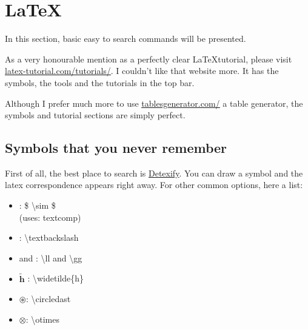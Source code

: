 \section{\LaTeX}
\par In this section, basic easy to search commands will be presented.
\vspace{1cm}

\par As a very honourable mention as a perfectly clear \LaTeX tutorial, please visit \href{https://www.latex-tutorial.com/tutorials/}{\ul{latex-tutorial.com/tutorials/}}. I couldn't like that website more. It has the symbols, the tools and the tutorials in the top bar. 
\par Although I prefer much more to use \href{https://www.tablesgenerator.com/}{\ul{tablesgenerator.com/}} a table generator, the symbols and tutorial sections are simply perfect.








\subsection{Symbols that you never remember}

\par First of all, the best place to search is \href{http://detexify.kirelabs.org/classify.html}{\ul{Detexify}}. You can draw a symbol and the latex correspondence appears right away. 
For other common options, here a list:


\begin{multicols}{2}
\begin{itemize}
    \item \bb{$\sim$} \qquad {}:  \$ \textbackslash sim \$ \\(uses: textcomp)
    \item \bb{\textbackslash} : \textbackslash textbackslash %
    \item \bb{$\ll$} and \bb{$\gg$} : \textbackslash ll and \textbackslash gg
    \item $\mathbf{\widetilde{h}}$ : \textbackslash widetilde\{h\}
    \item $\mathbf{\circledast}$:  \textbackslash circledast
    \item $\mathbf{\otimes}$: \textbackslash otimes
\end{itemize}
\end{multicols}





